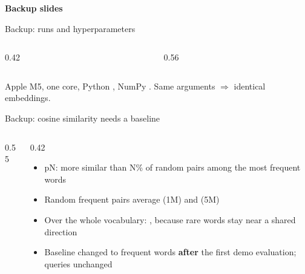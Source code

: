 \documentclass[aspectratio=169,11pt]{beamer}
\newcommand{\hl}[1]{\textcolor{accent}{\textbf{#1}}}
\begin{document}
\begin{frame}[plain]
    \vfill
    \centering
    {\LARGE\bfseries Backup slides\par}
    \vfill
\end{frame}

\begin{frame}{Backup: runs and hyperparameters}
    \begin{columns}[T]
        \begin{column}{0.42\textwidth}
            \resizebox{\linewidth}{!}{}
        \end{column}
        \begin{column}{0.56\textwidth}
            \resizebox{\linewidth}{!}{}
        \end{column}
    \end{columns}
    \vspace{3mm}
    \small Apple M5, one core, Python \FinalPython, NumPy \FinalNumpy. Same arguments $\Rightarrow$ identical embeddings.
\end{frame}

\begin{frame}{Backup: cosine similarity needs a baseline}
    \begin{columns}[T]
        \begin{column}{0.55\textwidth}
            \resizebox{\linewidth}{!}{}
        \end{column}
        \begin{column}{0.42\textwidth}
            \small
            \begin{itemize}
                \item pN: more similar than N\% of random pairs among the \BaselineWords{} most frequent words
                \item Random frequent pairs average \DemoBaselineMean{} (1M) and \FinalBaselineMean{} (5M)
                \item Over the whole vocabulary: \FinalBaselineAllMean{}, because rare words stay near a shared direction
                \item Baseline changed to frequent words \hl{after} the first demo evaluation; queries unchanged
            \end{itemize}
        \end{column}
    \end{columns}
\end{frame}
\end{document}
